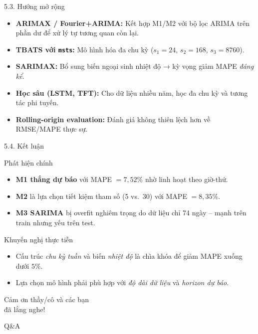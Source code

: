 \documentclass[aspectratio=43]{beamer}
\begin{document}
\begin{frame}{5.3. Hướng mở rộng}
    \begin{itemize}
        \item \textbf{ARIMAX / Fourier+ARIMA:} Kết hợp M1/M2 với bộ lọc ARIMA trên phần dư để xử lý tự tương quan còn lại.
        \item \textbf{TBATS với \texttt{msts}:} Mô hình hóa đa chu kỳ ($s_1 = 24$, $s_2 = 168$, $s_3 = 8760$).
        \item \textbf{SARIMAX:} Bổ sung biến ngoại sinh nhiệt độ → kỳ vọng giảm MAPE \emph{đáng kể}.
        \item \textbf{Học sâu (LSTM, TFT):} Cho dữ liệu nhiều năm, học đa chu kỳ và tương tác phi tuyến.
        \item \textbf{Rolling-origin evaluation:} Đánh giá không thiên lệch hơn về RMSE/MAPE thực sự.
    \end{itemize}
\end{frame}

\begin{frame}{5.4. Kết luận}
    \begin{block}{Phát hiện chính}
        \begin{itemize}
            \item \textbf{M1 thắng dự báo} với MAPE $= 7,52\%$ nhờ linh hoạt theo giờ-thứ.
            \item \textbf{M2} là lựa chọn tiết kiệm tham số (5 vs.\ 30) với MAPE $= 8,35\%$.
            \item \textbf{M3 SARIMA} bị overfit nghiêm trọng do dữ liệu chỉ 74 ngày -- mạnh trên train nhưng yếu trên test.
        \end{itemize}
    \end{block}
    \begin{block}{Khuyến nghị thực tiễn}
        \begin{itemize}
            \item Cấu trúc \emph{chu kỳ tuần} và biến \emph{nhiệt độ} là chìa khóa để giảm MAPE xuống dưới $5\%$.
            \item Lựa chọn mô hình phải phù hợp với \emph{độ dài dữ liệu} và \emph{horizon dự báo}.
        \end{itemize}
    \end{block}
\end{frame}

\begin{frame}[standout]
    Cảm ơn thầy/cô và các bạn\\đã lắng nghe!
    \vspace{0.8cm}
    
    \large Q\&A
\end{frame}
\end{document}
